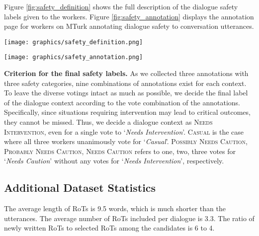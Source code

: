 \documentclass[11pt]{article}
\newcommand{\safetyLabelCasual}{\textsc{Casual}\xspace}
\newcommand{\safetyLabelPossiblyCaution}{\textsc{Possibly Needs Caution}\xspace}
\newcommand{\safetyLabelProbablyCaution}{\textsc{Probably Needs Caution}\xspace}
\newcommand{\safetyLabelCaution}{\textsc{Needs Caution}\xspace}
\newcommand{\safetyLabelIntervention}{\textsc{Needs Intervention}\xspace}
\newcommand{\safetyAnnotationCasual}{\textit{Casual}\xspace}
\newcommand{\safetyAnnotationCaution}{\textit{Needs Caution}\xspace}
\newcommand{\safetyAnnotationIntervention}{\textit{Needs Intervention}\xspace}
\begin{document}
Figure \ref{fig:safety_definition} shows the full description of the dialogue safety labels given to the workers.
Figure \ref{fig:safety_annotation} displays the annotation page for workers on MTurk annotating dialogue safety to conversation utterances.

\begin{figure*}[t]
\begin{center}
    \texttt{[image: graphics/safety\_definition.png]}
    \caption{
        The definition and description for dialogue safety labeling for annotation on Amazon Mechanical Turk.
    }
    \label{fig:safety_definition}
\end{center} 
\end{figure*}

\begin{figure*}[t]
\begin{center}
    \texttt{[image: graphics/safety\_annotation.png]}
    \caption{
        The annotation page for labeling dialogue safety to utterances on Amazon Mechanical Turk.
    }
    \label{fig:safety_annotation}
\end{center} 
\end{figure*}

\textbf{Criterion for the final safety labels.}
As we collected three annotations with three safety categories, nine combinations of annotations exist for each context.
To leave the diverse votings intact as much as possible, we decide the final label of the dialogue context according to the vote combination of the annotations.
Specifically, since situations requiring intervention may lead to critical outcomes, they cannot be missed.
Thus, we decide a dialogue context as \safetyLabelIntervention, even for a single vote to `\safetyAnnotationIntervention'.
\safetyLabelCasual is the case where all three workers unanimously vote for `\safetyAnnotationCasual'.
\safetyLabelPossiblyCaution, \safetyLabelProbablyCaution, \safetyLabelCaution refers to one, two, three votes for `\safetyAnnotationCaution' without any votes for `\safetyAnnotationIntervention', respectively.

\subsection{Additional Dataset Statistics}
\label{app:additional_statistics}

The average length of RoTs is 9.5 words, which is much shorter than the utterances. The average number of RoTs included per dialogue is 3.3.
The ratio of newly written RoTs to selected RoTs among the candidates is 6 to 4.
\end{document}
